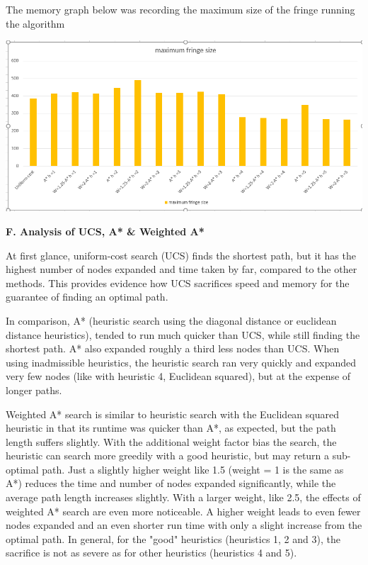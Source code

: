 \documentclass[12pt, letterpaper]{article}
\begin{document}
\medskip

The memory graph below was recording the maximum size of the fringe running the algorithm

\medskip

\noindent \includegraphics[scale=0.65]{"avg-mem"}

\medskip

\pagebreak %

\noindent \textbf{F. Analysis of UCS, A* \& Weighted A*}

At first glance, uniform-cost search (UCS) finds the shortest path, but it has the highest number of nodes expanded and time taken by far, compared to the other methods. This provides evidence how UCS sacrifices speed and memory for the guarantee of finding an optimal path.

In comparison, A* (heuristic search using the diagonal distance or euclidean distance heuristics),  tended to run much quicker than UCS, while still finding the shortest path. A* also expanded roughly a third less nodes than UCS. When using inadmissible heuristics, the heuristic search ran very quickly and expanded very few nodes (like with heuristic 4, Euclidean squared), but at the expense of longer paths.

Weighted A* search is similar to heuristic search with the Euclidean squared heuristic in that its runtime was quicker than A*, as expected, but the path length suffers slightly. With the additional weight factor bias the search, the heuristic can search more greedily with a good heuristic, but may return a sub-optimal path. Just a slightly higher weight like 1.5 (weight = 1 is the same as A*) reduces the time and number of nodes expanded significantly, while the average path length increases slightly. With a larger weight, like 2.5, the effects of weighted A* search are even more noticeable. A higher weight leads to even fewer nodes expanded and an even shorter run time with only a slight increase from the optimal path. In general, for the "good" heuristics (heuristics 1, 2 and 3), the sacrifice is not as severe as for other heuristics (heuristics 4 and 5). \newline
\end{document}
